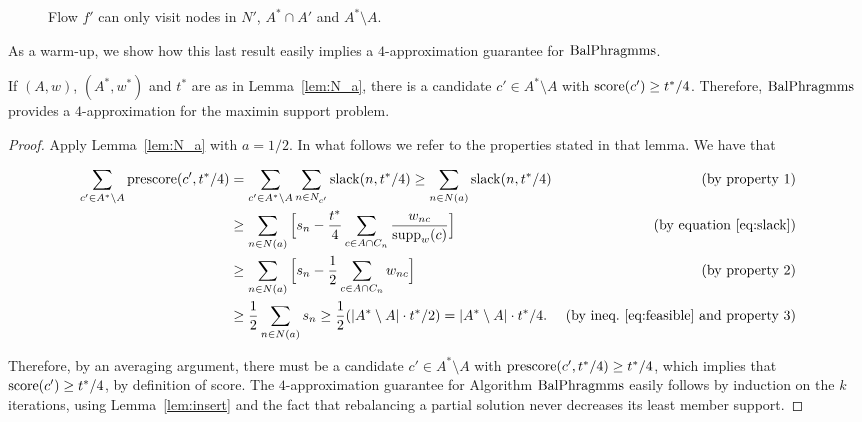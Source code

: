 \begin{figure}[htb]
\begin{center}
{
}
\end{center}
\caption{Flow $f'$ can only visit nodes in $N'$, $A^*\cap A'$ and $A^*\setminus A$.}
\label{fig:sets}
\end{figure}

As a warm-up, we show how this last result easily implies a $4$-approximation guarantee for $\operatorname{BalPhragmms}$.

\begin{lemma}
If $(A,w)$, $(A^*,w^*)$ and $t^*$ are as in Lemma~\ref{lem:N_a}, there is a candidate $c'\in A^*\setminus A$ with $\operatorname{score}(c')\geq t^*/4$. Therefore, $\operatorname{BalPhragmms}$ provides a $4$-approximation for the maximin support problem.
\end{lemma}

\begin{proof}
Apply Lemma~\ref{lem:N_a} with $a=1/2$. In what follows we refer to the properties stated in that lemma. We have that

\begin{align*}
    \sum_{c'\in A^*\setminus A} \operatorname{prescore}(c',t^*/4) &=\sum_{c'\in A^*\setminus A} \sum_{n\in N_{c'}} \operatorname{slack}(n,t^*/4)
    \geq \sum_{n\in N(a)} \operatorname{slack}(n,t^*/4) & \text{(by property 1)}\\
    &\geq \sum_{n\in N(a)} \Big[ s_n - \frac{t^*}{4}\sum_{c\in A\cap C_n} \frac{w_{nc}}{\operatorname{supp}_w(c)} \Big] &\text{(by equation \ref{eq:slack})}\\
    &\geq \sum_{n\in N(a)} \Big[ s_n - \frac{1}{2}\sum_{c\in A\cap C_n} w_{nc} \Big] &\text{(by property 2)}\\
    &\geq \frac{1}{2}\sum_{n\in N(a)} s_n 
		\geq \frac{1}{2} (|A^*\setminus A|\cdot t^*/2) = |A^*\setminus A|\cdot t^*/4. 
    &\text{(by ineq.~\ref{eq:feasible} and property 3)}
\end{align*}

Therefore, by an averaging argument, there must be a candidate $c'\in A^*\setminus A$ with $\operatorname{prescore}(c',t^*/4)\geq t^*/4$, which implies that $\operatorname{score}(c')\geq t^*/4$, by definition of score. The $4$-approximation guarantee for Algorithm $\operatorname{BalPhragmms}$ easily follows by induction on the $k$ iterations, using Lemma~\ref{lem:insert} and the fact that rebalancing a partial solution never decreases its least member support.
\end{proof}


